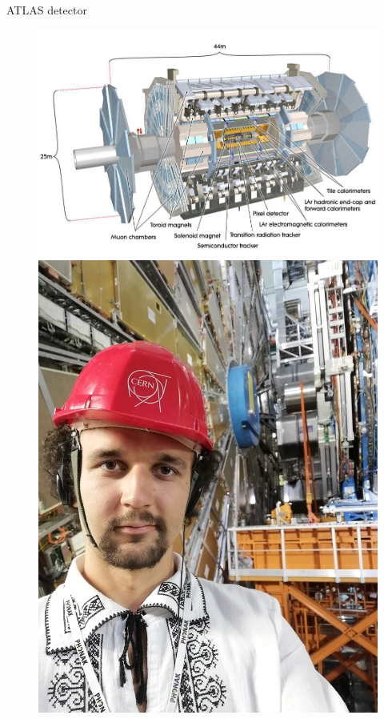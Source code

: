 \documentclass[10pt]{beamer} %
\begin{document}
\begin{frame}{ATLAS detector}
    
    \begin{figure}[ht]
        \begin{minipage}[b]{0.64\linewidth}
             \centering
            \includegraphics[width=1.00\textwidth]{Figs/atlas-detector.png}
        \end{minipage}
        \hfill
        \begin{minipage}[b]{0.34\linewidth}
            \centering
            \includegraphics[width=1.00\textwidth]{Figs/atlas-my-pic.jpg}
        \end{minipage}
\end{figure}


\end{frame}
\end{document}
